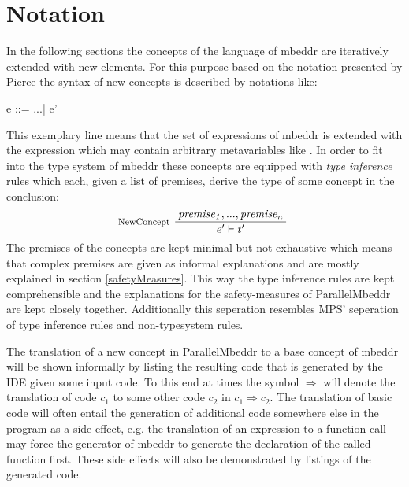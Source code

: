 \section{Notation}
In the following sections the concepts of the language of mbeddr are iteratively extended with new elements. For this purpose based on the notation presented by Pierce\cite{TypesAndProgrammingLanguages} the syntax of new concepts is described by notations like:
\begin{ccode}
e ::= ...| e'
\end{ccode}
This exemplary line means that the set of expressions of mbeddr is extended with the expression  which may contain arbitrary metavariables like . In order to fit into the type system of mbeddr these concepts are equipped with \textit{type inference} rules which each, given a list of premises, derive the type of some concept in the conclusion:
\begin{align*}
\inference*[NewConcept]{\mathit{premise_1}, ..., \mathit{premise_n}}{\qquad\quad e' |- t' \qquad\quad} 
\end{align*}
The premises of the concepts are kept minimal but not exhaustive which means that complex premises are given as informal explanations and are mostly explained in section \ref{safetyMeasures}. This way the type inference rules are kept comprehensible and the explanations for the safety-measures of ParallelMbeddr are kept closely together. Additionally this seperation resembles MPS' seperation of type inference rules and non-typesystem rules.

The translation of a new concept in ParallelMbeddr to a base concept of mbeddr will be shown informally by listing the resulting code that is generated by the IDE given some input code. To this end at times the symbol $\Longrightarrow$ will denote the translation of code $c_1$ to some other code $c_2$ in $c_1 \Longrightarrow c_2$. The translation of basic code will often entail the generation of additional code somewhere else in the program as a side effect, e.g. the translation of an expression to a function call may force the generator of mbeddr to generate the declaration of the called function first. These side effects will also be demonstrated by listings of the generated code.